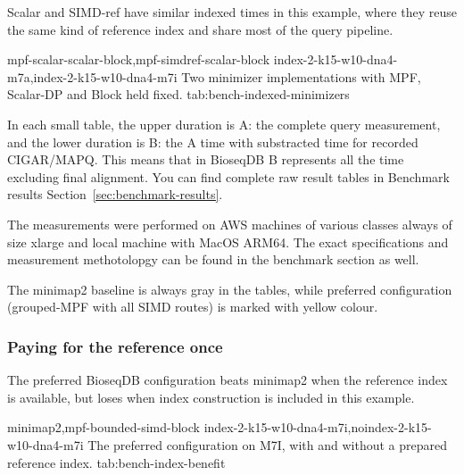 Scalar and SIMD-ref have similar indexed times in this example, where they
reuse the same kind of reference index and share most of the query pipeline.

  {mpf-scalar-scalar-block,mpf-simdref-scalar-block}
  {index-2-k15-w10-dna4-m7a,index-2-k15-w10-dna4-m7i}
  {Two minimizer implementations with MPF, Scalar-DP and Block held fixed.}
  {tab:bench-indexed-minimizers}


In each small table, the upper duration is A: the complete query measurement,
and the lower duration is B: the A time with substracted time for recorded CIGAR/MAPQ.
This means that in BioseqDB B represents all the time excluding final alignment.
You can find complete raw result tables in Benchmark results Section~\ref{sec:benchmark-results}.

The measurements were performed on AWS machines of various classes always of size xlarge and local machine with MacOS ARM64.
The exact specifications and measurement methotolopgy can be found in the benchmark section as well.

The minimap2 baseline is always gray in the tables, while preferred configuration (grouped-MPF with all SIMD routes) is marked with yellow colour.

\subsubsection{Paying for the reference once}
\label{sec:bench-index-benefit}

The preferred BioseqDB configuration beats minimap2 when the reference index
is available, but loses when index construction is included in this example.

  {minimap2,mpf-bounded-simd-block}
  {index-2-k15-w10-dna4-m7i,noindex-2-k15-w10-dna4-m7i}
  {The preferred configuration on M7I, with and without a prepared reference index.}
  {tab:bench-index-benefit}

